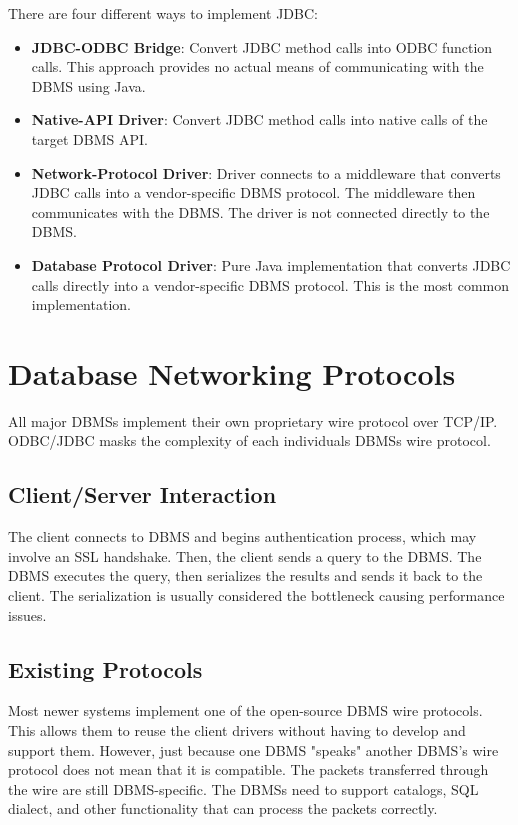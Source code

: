 \documentclass[11pt]{article}
\begin{document}
There are four different ways to implement JDBC:
\begin{itemize}
    \item \textbf{JDBC-ODBC Bridge}: Convert JDBC method calls into ODBC function calls. This approach provides no actual means of communicating with the DBMS using Java.
    \item \textbf{Native-API Driver}: Convert JDBC method calls into native calls of the target DBMS API.
    \item \textbf{Network-Protocol Driver}: Driver connects to a middleware that converts JDBC calls into a vendor-specific DBMS protocol. The middleware then communicates with the DBMS. The driver is not connected directly to the DBMS.
    \item \textbf{Database Protocol Driver}: Pure Java implementation that converts JDBC calls directly into a vendor-specific DBMS protocol. This is the most common implementation.
\end{itemize}

\section{Database Networking Protocols}
All major DBMSs implement their own proprietary wire protocol over TCP/IP. ODBC/JDBC masks the complexity of each individuals DBMSs wire protocol.

\subsection*{Client/Server Interaction}
The client connects to DBMS and begins authentication process, which may involve an SSL handshake. Then, the client sends a query to the DBMS. The DBMS executes the query, then serializes the results and sends it back to the client. The serialization is usually considered the bottleneck causing performance issues.

\subsection*{Existing Protocols}
Most newer systems implement one of the open-source DBMS wire protocols. This allows them to reuse the client drivers without having to develop and support them. However, just because one DBMS "speaks" another DBMS's wire protocol does not mean that it is compatible. The packets transferred through the wire are still DBMS-specific. The DBMSs need to support catalogs, SQL dialect, and other functionality that can process the packets correctly.
\end{document}
